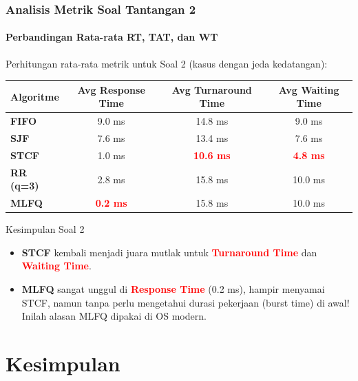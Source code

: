\documentclass[t,aspectratio=169,xcolor=dvipsnames]{beamer}
\newcommand{\tem}[1]{\textbf{\textcolor{red}{#1}}}
\begin{document}
\begin{frame}
    \frametitle{Analisis Metrik Soal Tantangan 2}
    \framesubtitle{Perbandingan Rata-rata RT, TAT, dan WT}
    \scriptsize
    Perhitungan rata-rata metrik untuk Soal 2 (kasus dengan jeda kedatangan):
    \vspace{0.2cm}
    \begin{table}[]
        \centering
        \begin{tabular}{lccc}
            \toprule
            \textbf{Algoritme} & \textbf{Avg Response Time} & \textbf{Avg Turnaround Time} & \textbf{Avg Waiting Time} \\
            \midrule
            \textbf{FIFO} & 9.0 ms & 14.8 ms & 9.0 ms \\
            \textbf{SJF} & 7.6 ms & 13.4 ms & 7.6 ms \\
            \textbf{STCF} & 1.0 ms & \tem{10.6 ms} & \tem{4.8 ms} \\
            \textbf{RR (q=3)} & 2.8 ms & 15.8 ms & 10.0 ms \\
            \textbf{MLFQ} & \tem{0.2 ms} & 15.8 ms & 10.0 ms \\
            \bottomrule
        \end{tabular}
    \end{table}
    \vspace{0.2cm}
    \begin{alertblock}{Kesimpulan Soal 2}
        \begin{itemize}
            \item \textbf{STCF} kembali menjadi juara mutlak untuk \tem{Turnaround Time} dan \tem{Waiting Time}.
            \item \textbf{MLFQ} sangat unggul di \tem{Response Time} (0.2 ms), hampir menyamai STCF, namun tanpa perlu mengetahui durasi pekerjaan (burst time) di awal! Inilah alasan MLFQ dipakai di OS modern.
        \end{itemize}
    \end{alertblock}
\end{frame}

\section{Kesimpulan}
\end{document}
